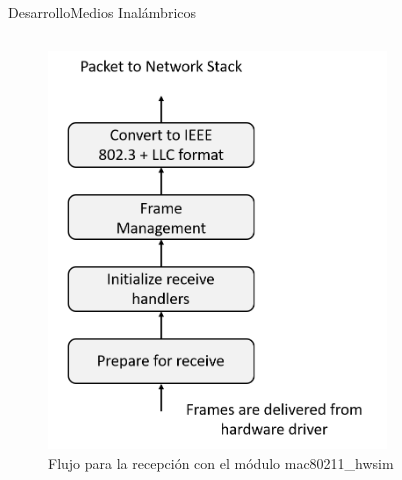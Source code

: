 \documentclass[10pt,compress,xcolor=table]{beamer} %
\begin{document}
\begin{frame}{Desarrollo}{Medios Inalámbricos}

\begin{columns}

  \begin{column}{0.5\textwidth}
    \begin{figure}
      \includegraphics[width=0.8\textwidth]{img/linux_wireless_subsystem_rx.png}
      \caption{ Flujo para la recepción con el módulo mac80211\_hwsim}
      \label{fig:a}
    \end{figure}
        

\end{column}
\end{columns}
\end{frame}
\end{document}
